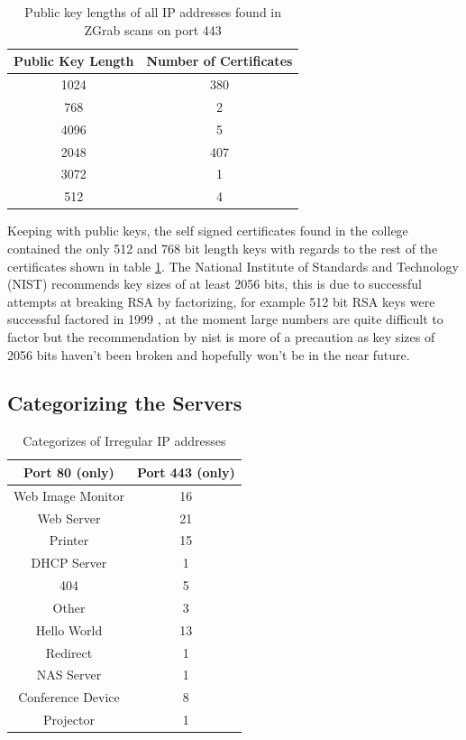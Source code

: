 \documentclass[a4wide,leqno,12pt]{report}
\begin{document}
\begin{table}[H]
\centering
\begin{tabular}{||c c  ||}
 \hline
Public Key Length  & Number of Certificates\\ [0.5ex]
 \hline\hline
1024 & 380\\
768	& 2\\
4096 &	5\\
2048 &407\\
3072 & 1\\
512	& 4\\[1ex]

 \hline
\end{tabular}
\caption{Public key lengths of all IP addresses found in ZGrab scans on port 443}
\label{table:public_key_lengths}
\end{table}
Keeping with public keys, the self signed certificates found in the college contained the only 512 and 768 bit length keys with regards to the rest of the certificates shown in table \ref{table:public_key_lengths}. The National Institute of Standards and Technology (NIST) recommends key sizes of at least 2056 bits, \cite{barker2015recommendation} this is due to successful attempts at breaking RSA by factorizing, for example 512 bit RSA keys were successful factored in 1999 \cite{kaliski2011rsa}, at the moment large numbers are quite difficult to factor but the recommendation by nist is more of a precaution as key sizes of 2056 bits haven't been broken and hopefully won't be in the near future.

\subsection{Categorizing the Servers}
\begin{table}[H]
\centering
\begin{tabular}{||c c  ||}
 \hline
 Port 80 (only) & Port 443 (only)\\ [0.5ex]
 \hline\hline
Web Image Monitor& 16\\
Web Server & 21\\
Printer&15\\
DHCP Server&1\\
404&5\\
Other& 3\\
Hello World&13\\
Redirect&1\\
NAS Server&1\\
Conference Device&8\\
Projector&1\\[1ex]

 \hline
\end{tabular}
\caption{Categorizes of Irregular IP addresses}
\label{table:category}
\end{table}
\end{document}
